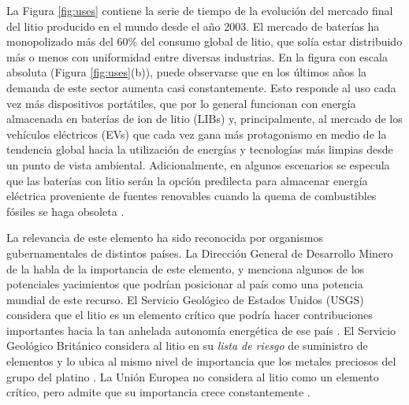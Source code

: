 La Figura \ref{fig:uses} contiene la serie de tiempo de la evolución del mercado final del litio producido en el mundo desde el año 2003. El mercado de baterías ha monopolizado más del 60\% del consumo global de litio, que solía estar distribuido más o menos con uniformidad entre diversas industrias. En la figura con escala absoluta (Figura \ref{fig:uses}(b)), puede observarse que en los últimos años la demanda de este sector aumenta casi constantemente. Esto responde al uso cada vez más dispositivos portátiles, que por lo general funcionan con energía almacenada en baterías de ion de litio (LIBs) y, principalmente, al mercado de los vehículos eléctricos (EVs) que cada vez gana más protagonismo en medio de la tendencia global hacia la utilización de energías y tecnologías más limpias desde un punto de vista ambiental. Adicionalmente, en algunos escenarios se especula que las baterías con litio serán la opción predilecta para almacenar energía eléctrica proveniente de fuentes renovables cuando la quema de combustibles fósiles se haga obsoleta \citep{SVERDRUP2016}.

La relevancia de este elemento ha sido reconocida por organismos gubernamentales de distintos países. La Dirección General de Desarrollo Minero de la \citet{SecEc2018} habla de la importancia de este elemento, y menciona algunos de los potenciales yacimientos que podrían posicionar al país como una potencia mundial de este recurso. El Servicio Geológico de Estados Unidos (USGS) considera que el litio es un elemento crítico que podría hacer contribuciones importantes hacia la tan anhelada autonomía energética de ese país \citep{Bradley2017}. El Servicio Geológico Británico considera al litio en su \textit{lista de riesgo} de suministro de elementos y lo ubica al mismo nivel de importancia que los metales preciosos del grupo del platino \citep{STERBA2019416}. La Unión Europea no considera al litio como un elemento crítico, pero admite que su importancia crece constantemente \citep{European2018}.

